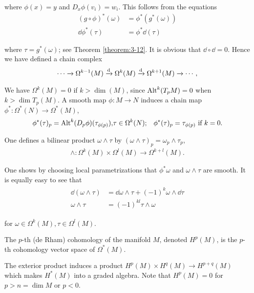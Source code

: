 where $\phi(x)= y$ and $D_x\phi(v_i) = w_i$. This follows from the equations 
\begin{align*}
  (g\circ \phi)^*(\omega) & = \phi^*(g^*(\omega)) \\
  \dd\phi^*(\tau) & = \phi^*\dd(\tau)
\end{align*}

where $\tau = g^*(\omega)$; see Theorem \ref{theorem:3-12}. It is obvious that $\dd\circ\dd = 0$.
Hence we have defined a chain complex
\begin{align*}
  \cdots \xra \Omega^{k-1}(M) \xra[\dd]\Omega^k(M)\xra[\dd]\Omega^{k+1}(M)\xra \cdots,
\end{align*}

We have $\Omega^k(M) = 0$ if $k>\dim(M)$, since $\operatorname{Alt}^k(T_pM) = 0$ when $k>\dim T_p(M)$. A smooth
map $\phi:M\to N$ induces a chain map $\phi^*:\Omega^*(N)\to \Omega^*(M)$, 
\begin{align}
  \phi^*(\tau)_p 
  = \operatorname{Alt}^k(D_p\phi)(\tau_{\phi(p)}), 
  & \tau\in \Omega^k(N);
  & \phi^*(\tau)_p = \tau_{\phi(p)} \text{ if } k=0. 
\end{align}

One defines a bilinear product $\omega\wedge\tau$ by $(\omega\wedge\tau)_p = \omega_p\wedge\tau_p$,
\begin{align}
  \wedge:\Omega^k(M)\times\Omega^l(M)\to \Omega^{k+l}(M).
\end{align}

One shows by choosing local parametrizations that $\phi^*\omega$ and $\omega\wedge\tau$ are smooth.
It is equally easy to see that
\begin{align}
  \begin{aligned}
    \dd(\omega\wedge\tau) & = \dd\omega\wedge\tau + (-1)^k\omega\wedge\dd\tau \\
    \omega\wedge\tau & = (-1)^{kl}\tau\wedge\omega
  \end{aligned}
\end{align}

for $\omega\in\Omega^k(M), \tau\in\Omega^l(M)$.

\begin{definition}\label{definition:9-7}
  The $p$-th (de Rham) cohomology of the manifold $M$, denoted $H^p(M)$, is the $p$-th cohomology 
  vector space of $\Omega^*(M)$.
\end{definition}

The exterior product induces a product $H^p(M)\times H^q(M)\to H^{p+q}(M)$ which
makes $H^*(M)$ into a graded algebra. Note that $H^p(M) = 0$ for $p> n = \dim M$
or $p<0$.


